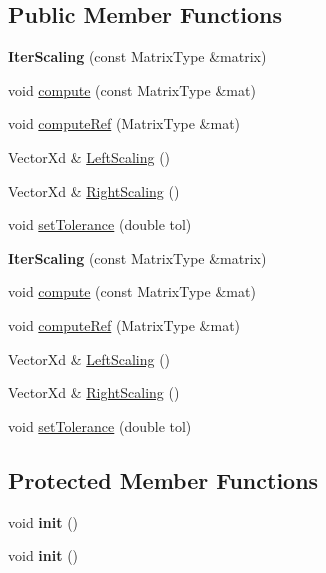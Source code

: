 \subsection*{Public Member Functions}
\begin{DoxyCompactItemize}
\item 
\mbox{\label{class_eigen_1_1_iter_scaling_acd60819fd4802c23ea3172576c6b3d01}} 
{\bfseries Iter\+Scaling} (const Matrix\+Type \&matrix)
\item 
void \hyperlink{class_eigen_1_1_iter_scaling_a6a76754399fd004b3ac6011e272ffb71}{compute} (const Matrix\+Type \&mat)
\item 
void \hyperlink{class_eigen_1_1_iter_scaling_aeff5ccef2ccb32c6f472a190f8a511af}{compute\+Ref} (Matrix\+Type \&mat)
\item 
Vector\+Xd \& \hyperlink{class_eigen_1_1_iter_scaling_ab88d288be912d90a1e597e5dab0bd47b}{Left\+Scaling} ()
\item 
Vector\+Xd \& \hyperlink{class_eigen_1_1_iter_scaling_a617229454935a6a4fda76b8af56c52ea}{Right\+Scaling} ()
\item 
void \hyperlink{class_eigen_1_1_iter_scaling_acbca5170d8043f40e387bcb6a42f8b71}{set\+Tolerance} (double tol)
\item 
\mbox{\label{class_eigen_1_1_iter_scaling_acd60819fd4802c23ea3172576c6b3d01}} 
{\bfseries Iter\+Scaling} (const Matrix\+Type \&matrix)
\item 
void \hyperlink{class_eigen_1_1_iter_scaling_a6a76754399fd004b3ac6011e272ffb71}{compute} (const Matrix\+Type \&mat)
\item 
void \hyperlink{class_eigen_1_1_iter_scaling_aeff5ccef2ccb32c6f472a190f8a511af}{compute\+Ref} (Matrix\+Type \&mat)
\item 
Vector\+Xd \& \hyperlink{class_eigen_1_1_iter_scaling_ab88d288be912d90a1e597e5dab0bd47b}{Left\+Scaling} ()
\item 
Vector\+Xd \& \hyperlink{class_eigen_1_1_iter_scaling_a617229454935a6a4fda76b8af56c52ea}{Right\+Scaling} ()
\item 
void \hyperlink{class_eigen_1_1_iter_scaling_acbca5170d8043f40e387bcb6a42f8b71}{set\+Tolerance} (double tol)
\end{DoxyCompactItemize}
\subsection*{Protected Member Functions}
\begin{DoxyCompactItemize}
\item 
\mbox{\label{class_eigen_1_1_iter_scaling_a1fd1fc1323a17313de45a3634ef52ddf}} 
void {\bfseries init} ()
\item 
\mbox{\label{class_eigen_1_1_iter_scaling_a1fd1fc1323a17313de45a3634ef52ddf}} 
void {\bfseries init} ()
\end{DoxyCompactItemize}
